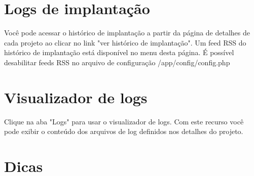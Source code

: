 \documentclass[12pt,a4paper]{report}
\begin{document}
\section{Logs de implantação}
Você pode acessar o histórico de implantação a partir da página de detalhes de cada projeto ao clicar no link "ver histórico de implantação".  Um feed RSS do histórico de implantação está disponível no menu desta página.  É possível desabilitar feeds RSS no arquivo de configuração /app/config/config.php 

\section{Visualizador de logs}
Clique na aba "Logs" para usar o visualizador de logs.  Com este recurso você pode exibir o conteúdo dos arquivos de log definidos nos detalhes do projeto.

\section{Dicas}
\end{document}
